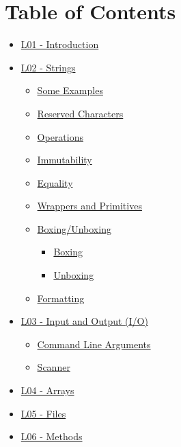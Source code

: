 \documentclass[]{article}
\date{}
\providecommand{\tightlist}{%
  \setlength{\itemsep}{0pt}\setlength{\parskip}{0pt}}
\begin{document}
\hypertarget{table-of-contents}{%
\section{Table of Contents}\label{table-of-contents}}

\begin{itemize}
\item
  \protect\hyperlink{l01---introduction}{L01 - Introduction}
\item
  \protect\hyperlink{l02---strings}{L02 - Strings}

  \begin{itemize}
  \tightlist
  \item
    \protect\hyperlink{some-examples}{Some Examples}
  \item
    \protect\hyperlink{reserved-characters}{Reserved Characters}
  \item
    \protect\hyperlink{operations}{Operations}
  \item
    \protect\hyperlink{immutability}{Immutability}
  \item
    \protect\hyperlink{equality}{Equality}
  \item
    \protect\hyperlink{wrappers-and-primitives}{Wrappers and Primitives}
  \item
    \protect\hyperlink{boxingux2funboxing}{Boxing/Unboxing}

    \begin{itemize}
    \tightlist
    \item
      \protect\hyperlink{boxing}{Boxing}
    \item
      \protect\hyperlink{unboxing}{Unboxing}
    \end{itemize}
  \item
    \protect\hyperlink{formatting}{Formatting}
  \end{itemize}
\item
  \protect\hyperlink{l03---input-and-output-iux2fo}{L03 - Input and
  Output (I/O)}

  \begin{itemize}
  \tightlist
  \item
    \protect\hyperlink{command-line-arguments}{Command Line Arguments}
  \item
    \protect\hyperlink{scanner}{Scanner}
  \end{itemize}
\item
  \protect\hyperlink{l04---arrays}{L04 - Arrays}
\item
  \protect\hyperlink{l05---files}{L05 - Files}
\item
  \protect\hyperlink{l06---methods}{L06 - Methods}


\end{itemize}
\end{document}
